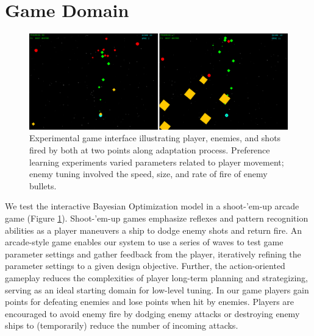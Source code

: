 \documentclass[letterpaper]{article}
\begin{document}




\section{Game Domain}

\begin{figure}[tbph]
\centering
\includegraphics[width=1\linewidth]{./bullethell_sidebyside}
\caption{Experimental game interface illustrating player, enemies, and shots fired by both at two points along adaptation process. Preference learning experiments varied parameters related to player movement; enemy tuning involved the speed, size, and rate of fire of enemy bullets.}
\label{fig:shmup}
\end{figure}

We test the interactive Bayesian Optimization model in a shoot-'em-up arcade game (Figure \ref{fig:shmup}). 
Shoot-'em-up games emphasize reflexes and pattern recognition abilities as a player maneuvers a ship to dodge enemy shots and return fire.
An arcade-style game enables our system to use a series of waves to test game parameter settings and gather feedback from the player, iteratively refining the parameter settings to a given design objective. Further, the action-oriented gameplay reduces the complexities of player long-term planning and strategizing, serving as an ideal starting domain for low-level tuning.
In our game players gain points for defeating enemies and lose points when hit by enemies. Players are encouraged to avoid enemy fire by dodging enemy attacks or destroying enemy ships to (temporarily) reduce the number of incoming attacks.
\end{document}
